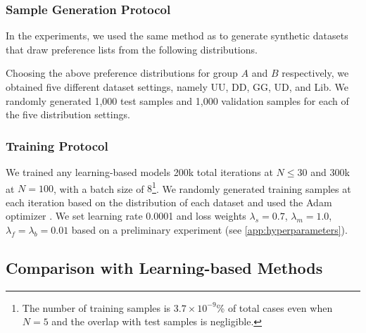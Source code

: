 \subsubsection{Sample Generation Protocol}
In the experiments, we used the same method as \cite{tziavelis2019equitable} to generate synthetic datasets that draw preference lists from the following distributions. 

Choosing the above preference distributions for group $A$ and $B$ respectively, we obtained five different dataset settings, namely UU, DD, GG, UD, and Lib.
We randomly generated 1,000 test samples and 1,000 validation samples for each of the five distribution settings.

\subsubsection{Training Protocol}
We trained any learning-based models 200k total iterations at $N\leq 30$ and 300k at $N=100$, with a batch size of $8$\footnote{The number of training samples is $3.7\times 10^{-9}$\% of total cases even when $N=5$ and the overlap with test samples is negligible.}. 
We randomly generated training samples at each iteration based on the distribution of each dataset and used the Adam optimizer \cite{adam}.
We set learning rate 0.0001 and loss weights $\lambda_s=0.7$, $\lambda_m=1.0$, $\lambda_f=\lambda_b=0.01$ based on a preliminary experiment (see \ref{app:hyperparameters}). 

\subsection{Comparison with Learning-based Methods}\label{ss:exp1}

